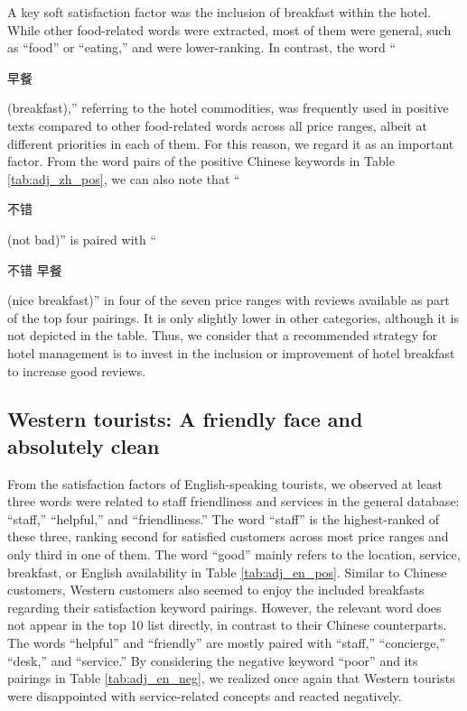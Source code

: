 \documentclass[smallextended,natbib]{svjour3}       %
\begin{document}
    A key soft satisfaction factor was the inclusion of breakfast within the hotel. While other food-related words were extracted, most of them were general, such as ``food'' or ``eating,'' and were lower-ranking. In contrast, the word ``\begin{CJK}{UTF8}{gbsn}早餐\end{CJK} (breakfast),'' referring to the hotel commodities, was frequently used in positive texts compared to other food-related words across all price ranges, albeit at different priorities in each of them. For this reason, we regard it as an important factor. From the word pairs of the positive Chinese keywords in Table \ref{tab:adj_zh_pos}, we can also note that ``\begin{CJK}{UTF8}{gbsn}不错\end{CJK} (not bad)'' is paired with ``\begin{CJK}{UTF8}{gbsn}不错 早餐\end{CJK} (nice breakfast)'' in four of the seven price ranges with reviews available as part of the top four pairings. It is only slightly lower in other categories, although it is not depicted in the table. Thus, we consider that a recommended strategy for hotel management is to invest in the inclusion or improvement of hotel breakfast to increase good reviews.

  \subsection{Western tourists: A friendly face and absolutely clean}\label{disc:en}

    From the satisfaction factors of English-speaking tourists, we observed at least three words were related to staff friendliness and services in the general database: ``staff,'' ``helpful,'' and ``friendliness.'' The word ``staff'' is the highest-ranked of these three, ranking second for satisfied customers across most price ranges and only third in one of them. The word ``good'' mainly refers to the location, service, breakfast, or English availability in Table \ref{tab:adj_en_pos}. Similar to Chinese customers, Western customers also seemed to enjoy the included breakfasts regarding their satisfaction keyword pairings. However, the relevant word does not appear in the top 10 list directly, in contrast to their Chinese counterparts. The words ``helpful'' and ``friendly'' are mostly paired with ``staff,'' ``concierge,'' ``desk,'' and ``service.'' By considering the negative keyword ``poor'' and its pairings in Table \ref{tab:adj_en_neg}, we realized once again that Western tourists were disappointed with service-related concepts and reacted negatively.
\end{document}
